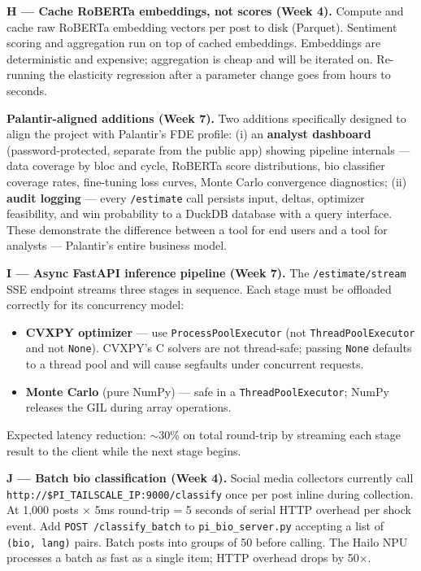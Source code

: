 \documentclass[11pt]{article}
\begin{document}
\textbf{H --- Cache RoBERTa embeddings, not scores (Week 4).}
Compute and cache raw RoBERTa embedding vectors per post to disk (Parquet).
Sentiment scoring and aggregation run on top of cached embeddings. Embeddings
are deterministic and expensive; aggregation is cheap and will be iterated on.
Re-running the elasticity regression after a parameter change goes from hours
to seconds.

\textbf{Palantir-aligned additions (Week 7).}
Two additions specifically designed to align the project with Palantir's FDE
profile: (i) an \textbf{analyst dashboard} (password-protected, separate from
the public app) showing pipeline internals --- data coverage by bloc and cycle,
RoBERTa score distributions, bio classifier coverage rates, fine-tuning loss
curves, Monte Carlo convergence diagnostics; (ii) \textbf{audit logging} --- every
\texttt{/estimate} call persists input, deltas, optimizer feasibility, and win
probability to a DuckDB database with a query interface. These demonstrate the
difference between a tool for end users and a tool for analysts --- Palantir's
entire business model.

\textbf{I --- Async FastAPI inference pipeline (Week 7).}
The \texttt{/estimate/stream} SSE endpoint streams three stages in sequence. Each
stage must be offloaded correctly for its concurrency model:
\begin{itemize}[leftmargin=1.6em, itemsep=1pt]
  \item \textbf{CVXPY optimizer} --- use \texttt{ProcessPoolExecutor} (not
        \texttt{ThreadPoolExecutor} and not \texttt{None}). CVXPY's C solvers are
        not thread-safe; passing \texttt{None} defaults to a thread pool and will
        cause segfaults under concurrent requests.
  \item \textbf{Monte Carlo} (pure NumPy) --- safe in a \texttt{ThreadPoolExecutor};
        NumPy releases the GIL during array operations.
\end{itemize}
Expected latency reduction: $\sim$30\% on total round-trip by streaming each stage
result to the client while the next stage begins.

\textbf{J --- Batch bio classification (Week 4).}
Social media collectors currently call \texttt{http://\$PI\_TAILSCALE\_IP:9000/classify}
once per post inline during collection. At 1,000 posts $\times$ 5ms round-trip
= 5 seconds of serial HTTP overhead per shock event. Add
\texttt{POST /classify\_batch} to \texttt{pi\_bio\_server.py} accepting a list
of \texttt{(bio, lang)} pairs. Batch posts into groups of 50 before calling.
The Hailo NPU processes a batch as fast as a single item; HTTP overhead drops
by 50$\times$.
\end{document}
